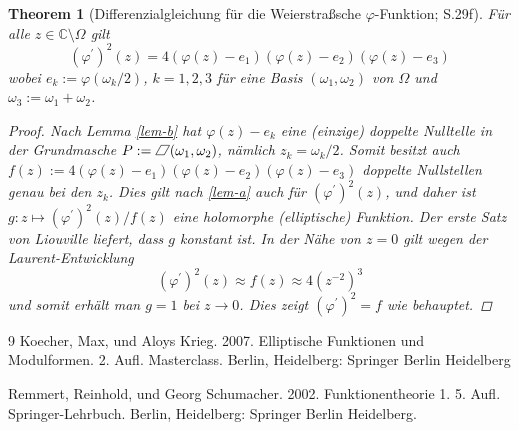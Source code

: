 \documentclass[12pt]{article}
\newtheorem{theorem}{Theorem}[section]
\numberwithin{equation}{section}
\newcommand{\kk}{\cite{kk} }
\newcommand*{\pa}{%
    \rlap{\rotatebox{-30}{\rule[.05ex]{.4pt}{.77em}}}%
    \kern.04em%
    \rlap{\kern.36em\raisebox{0.649519052835em}{\rule{.6em}{.4pt}}}%
    \rule{.6em}{.4pt}\kern-.04em%
    \rotatebox{-30}{\rule[.05ex]{.4pt}{.77em}}}
\newcommand{\basis}{$(\omega _1, \omega _2)$ }
\begin{document}
\begin{theorem}[Differenzialgleichung für die Weierstraßsche $\varphi$-Funktion; \kk S.29f]

Für alle \(z \in \mathbb C \setminus \Omega\) gilt \begin{equation}{
(\varphi ^\prime)^2(z) = 4 (\varphi(z)-e_1) (\varphi(z)-e_2) (\varphi(z)-e_3)
}\end{equation} wobei \(e_k := \varphi (\omega_k / 2)\), \(k=1,2,3\) für
eine Basis \basis von \(\Omega\) und
\(\omega_3 := \omega_1 + \omega_2\).

\begin{proof}

Nach Lemma \ref{lem-b} hat \(\varphi(z)-e_k\) eine (einzige) doppelte
Nulltelle in der Grundmasche \(P := \pa(\omega_1, \omega_2)\), nämlich
\(z_k = \omega_k / 2\). Somit besitzt auch
\(f(z) := 4 (\varphi(z)-e_1) (\varphi(z)-e_2) (\varphi(z)-e_3)\)
doppelte Nullstellen genau bei den \(z_k\). Dies gilt nach \ref{lem-a}
auch für \((\varphi ^\prime)^2(z)\), und daher ist
\(g : z \mapsto (\varphi ^\prime)^2(z) / f(z)\) eine holomorphe
(elliptische) Funktion. Der erste Satz von Liouville liefert, dass \(g\)
konstant ist. In der Nähe von \(z=0\) gilt wegen der Laurent-Entwicklung
\begin{equation}{
(\varphi ^\prime)^2(z) \approx f(z) \approx 4 (z^{-2})^3
}\end{equation} und somit erhält man \(g=1\) bei \(z \to 0\). Dies zeigt
\((\varphi ^\prime)^2 = f\) wie behauptet.

\end{proof}

\end{theorem}

\begin{thebibliography}{9}
Koecher, Max, und Aloys Krieg. 2007. Elliptische Funktionen und Modulformen. 2. Aufl. Masterclass. Berlin, Heidelberg: Springer Berlin Heidelberg

Remmert, Reinhold, und Georg Schumacher. 2002. Funktionentheorie 1. 5. Aufl. Springer-Lehrbuch. Berlin, Heidelberg: Springer Berlin Heidelberg.
\end{thebibliography}
\end{document}
